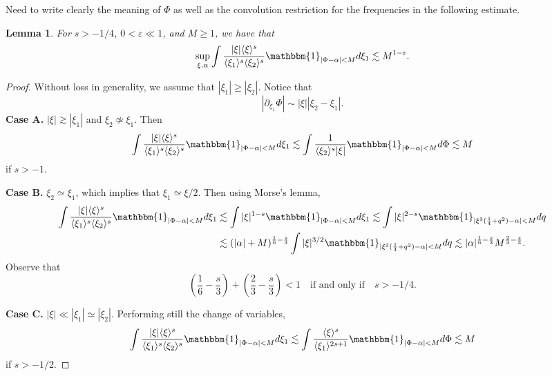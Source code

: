 \documentclass[a4paper, 11pt]{amsart}
\newcommand{\jap}[1]{\langle #1 \rangle}
\newcommand{\fia}{\mathbbm{1}_{|\Phi-\alpha|<M}}
\theoremstyle{plain}
\newtheorem{lem}[thm]{Lemma}
\theoremstyle{definition}
\theoremstyle{remark}
\newcommand{\5}{\text{V}}
\newcommand{\eps}{\varepsilon}
\numberwithin{equation}{section}
\theoremstyle{mytheoremstyle} \newtheorem{nota}[thm]{Remark}
\theoremstyle{mytheoremstyle} \newtheorem{exemplo}[thm]{Example}
\newcommand{\red}{\color{red}}
\newcommand{\blue}{\color{blue}}
\begin{document}
{\red
Need to write clearly the meaning of $\Phi$ as well as the convolution restriction for the frequencies in the following estimate.


}

\begin{lem}\label{lem:bilin}
\blue
For $s>-1/4$, $0<\eps\ll1$, and $M\ge 1$, we have that
\begin{equation}
    \sup_{\xi,\alpha} \int \frac{|\xi|\jap{\xi}^s}{\jap{\xi_1}^s\jap{\xi_2}^s} \fia d\xi_1 \lesssim M^{1-\eps}.
\end{equation}
\end{lem}
\begin{proof}
\blue
Without loss in generality, we assume that $|\xi_1|\ge |\xi_2|$. Notice that
$$
|\partial_{\xi_1} \Phi | \sim |\xi||\xi_2-\xi_1|.
$$
\textbf{Case A.} $|\xi| \gtrsim |\xi_1|$ and $\xi_2\not\simeq \xi_1$. Then
$$
\int \frac{|\xi|\jap{\xi}^s}{\jap{\xi_1}^s\jap{\xi_2}^s} \fia d\xi_1 \lesssim \int \frac{1}{\jap{\xi_2}^s |\xi|}\fia d\Phi \lesssim M
$$
if $s>-1$.

\noindent\textbf{Case B.} $\xi_2\simeq \xi_1$, which implies that $\xi_1\simeq \xi/2$. Then using Morse's lemma,
\begin{align*}
    \int \frac{|\xi|\jap{\xi}^s}{\jap{\xi_1}^s\jap{\xi_2}
^s} \fia d\xi_1 &\lesssim \int |\xi|^{1-s}\fia d\xi_1 \lesssim \int |\xi|^{2-s}\mathbbm{1}_{|\xi^3(\frac{1}{4}+q^2)-\alpha|<M} dq\\&\lesssim (|\alpha|+M)^{\frac16 - \frac{s}{3}}\int |\xi|^{3/2}\mathbbm{1}_{|\xi^3(\frac{1}{4}+q^2)-\alpha|<M} dq\lesssim  |\alpha|^{\frac16 - \frac{s}{3}}M^{\frac23 - \frac{s}{3}}.
\end{align*}
Observe that
$$
\left(\frac16 - \frac{s}{3}\right) + \left( \frac23 - \frac{s}{3}\right)<1 \quad \mbox{if and only if}\quad s>-1/4.
$$

\noindent\textbf{Case C.} $|\xi|\ll |\xi_1|\simeq |\xi_2|$. Performing still the change of variables,
$$
\int \frac{|\xi|\jap{\xi}^s}{\jap{\xi_1}^s\jap{\xi_2}^s} \fia d\xi_1 \lesssim \int \frac{\jap{\xi}^s}{\jap{\xi_1}^{2s+1} }\fia d\Phi \lesssim M
$$
if $s>-1/2$.
\end{proof}
\end{document}
